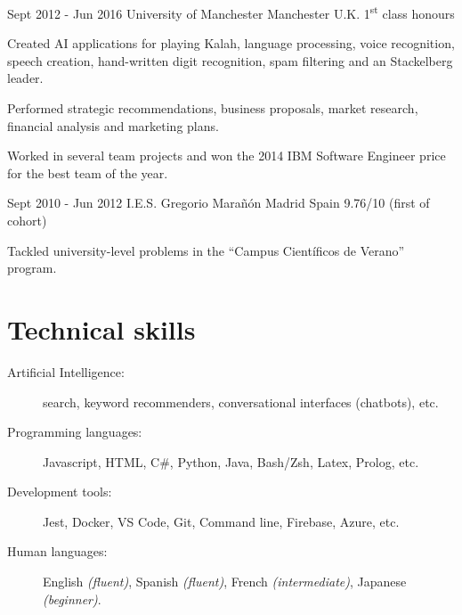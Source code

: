 \documentclass[10pt]{CurriculumVitae}
\begin{document}
      {Sept 2012 - Jun 2016}
      {University of Manchester}
      {Manchester}
      {U.K.}
      {1\textsuperscript{st} class honours}
      {
        \item Created AI applications for playing Kalah, language processing, voice recognition, speech creation, 
        hand-written digit recognition, spam filtering and an Stackelberg leader.
        \item Performed strategic recommendations, business proposals, market research, financial analysis and marketing plans.
         \item Worked in several team projects and won the 2014 IBM Software Engineer price for the best team of the year.
      }

      {Sept 2010 - Jun 2012}
      {I.E.S. Gregorio Marañón}
      {Madrid}
      {Spain}
      {9.76/10 (first of cohort)}
      {
        \item Tackled university-level problems in the ``Campus Científicos de Verano'' program.
      }


  \section{Technical skills}
    
    \begin{description}
      \item[Artificial Intelligence:] search, keyword recommenders, conversational interfaces (chatbots), etc.
      \item[Programming languages:] Javascript, HTML, C\#, Python, Java, Bash/Zsh, Latex, Prolog, etc.
      \item[Development tools:] Jest, Docker, VS Code, Git, Command line, Firebase, Azure, etc.
      \item[Human languages:] English \emph{(fluent)}, Spanish \emph{(fluent)}, French \emph{(intermediate)}, Japanese \emph{(beginner)}.
    \end{description}
\end{document}
